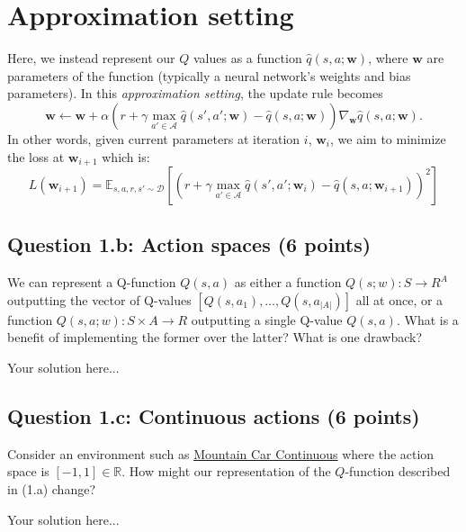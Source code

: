 \documentclass[12pt]{article}
\begin{document}
\section*{Approximation setting}
Here, we instead represent our $Q$ values as a function $\hat{q}(s,a;\mathbf{w})$, where $\mathbf{w}$ are parameters of the function (typically a neural network's weights and bias parameters). In this \textit{approximation setting}, the update rule becomes
\begin{equation}
\mathbf{w} \leftarrow \mathbf{w} + \alpha \left( r + \gamma \max_{a' \in \mathcal{A}} \hat{q}(s',a';\mathbf{w}) - \hat{q}(s,a;\mathbf{w}) \right) \nabla_{\mathbf{w}}\hat{q}(s,a;\mathbf{w}).
\end{equation}
In other words, given current parameters at iteration $i$, $\mathbf{w}_i$, we aim to minimize the loss at $\mathbf{w}_{i+1}$ which is:
\begin{equation}
L(\mathbf{w}_{i+1}) = \mathbb{E}_{s,a,r,s' \sim \mathcal{D}} \left[ \left( r + \gamma \max_{a' \in \mathcal{A}} \hat{q}(s',a';\mathbf{w}_{i}) - \hat{q}(s,a;\mathbf{w}_{i+1}) \right)^2 \right]
\end{equation}

\subsection*{Question 1.b: Action spaces (6 points)}
We can represent a Q-function $Q(s, a)$ as either a function $Q(s; w): S \rightarrow R^A$ outputting the vector of Q-values $[Q(s, a_1), …, Q(s, a_{|A|})]$ all at once, or a function $Q(s, a; w): S \times A \rightarrow R$ outputting a single Q-value $Q(s, a)$. What is a benefit of implementing the former over the latter? What is one drawback?
\begin{solution}
Your solution here...
\end{solution}

\subsection*{Question 1.c: Continuous actions (6 points)}
Consider an environment such as \href{https://www.gymlibrary.dev/environments/classic_control/mountain_car_continuous/}{Mountain Car Continuous} where the action space is $[-1,1] \in \mathbb{R}$. How might our representation of the $Q$-function described in (1.a) change?
\begin{solution}
Your solution here...
\end{solution}
\end{document}
